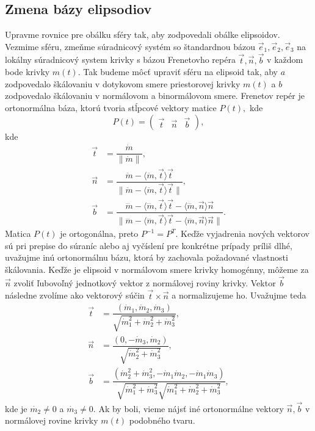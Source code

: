 \subsection{Zmena bázy elipsodiov}
Upravme rovnice pre obálku sféry tak, aby zodpovedali obálke elipsoidov. Vezmime sféru, zmeňme súradnicový systém so štandardnou bázou  $\vec{e}_1, \vec{e}_2, \vec{e}_3$ na lokálny súradnicový system krivky s bázou Frenetovho repéra $\vec{t}, \vec{n}, \vec{b}$ v každom bode krivky $m(t).$ Tak budeme môcť upraviť sféru na elipsoid tak, aby $a$ zodpovedalo škálovaniu v dotykovom smere priestorovej krivky $m(t)$ a $b$ zodpovedalo škálovaniu v normálovom a binormálovom smere. Frenetov repér je ortonormálna báza, ktorú tvoria stĺpcové vektory matice $P(t),$ kde
$$
P(t) = \left( \begin{matrix} \vec{t} & \vec{n} & \vec{b} \end{matrix} \right),
$$
kde
\begin{align*}
\vec{t} &= \dfrac{\dot{m}}{\| \dot{m} \|}, \\
\vec{n} &= \dfrac{\ddot{m} - \langle \ddot{m}, \vec{t} \rangle \vec{t}}{\| \ddot{m} - \langle \ddot{m}, \vec{t} \rangle \vec{t}\| }, \\
\vec{b} &= \dfrac{\dddot{m} - \langle \dddot{m}, \vec{t} \rangle \vec{t} - \langle \dddot{m}, \vec{n} \rangle \vec{n}}{\| \dddot{m} - \langle \dddot{m}, \vec{t} \rangle \vec{t} - \langle \dddot{m}, \vec{n} \rangle \vec{n} \| }.
\end{align*}
Matica $P(t)$ je ortogonálna, preto $P^{-1} = P^T.$
Keďže vyjadrenia nových vektorov sú pri prepise do súraníc alebo aj vyčíslení pre konkrétne prípady príliš dlhé, uvažujme inú ortonormálnu bázu, ktorá by zachovala požadované vlastnosti škálovania. Keďže je elipsoid v normálovom smere krivky homogénny, môžeme za $\vec{n}$ zvoliť ľubovoľný jednotkový vektor z normálovej roviny krivky. Vektor $\vec{b}$ následne zvolíme ako vektorový súčin $\vec{t} \times \vec{n}$ a normalizujeme ho. Uvažujme teda
\begin{align*}
\vec{t} &= \dfrac{(\dot{m}_1, \dot{m}_2, \dot{m}_3)}{\sqrt{\dot{m}_1^2 + \dot{m}_2^2 + \dot{m}_3^2}}, \\
\vec{n} &= \dfrac{(0, -\dot{m}_3, \dot{m}_2)}{\sqrt{\dot{m}_2^2 + \dot{m}_3^2}}, \\
\vec{b} &= \dfrac{(\dot{m}_2^2 + \dot{m}_3^2, -\dot{m}_1 \dot{m}_2, -\dot{m}_1 \dot{m}_3)}{\sqrt{\dot{m}_1^2 + \dot{m}_3^2}\sqrt{\dot{m}_1^2 + \dot{m}_2^2 + \dot{m}_3^2}},
\end{align*}
kde je $\dot{m_2} \neq 0$ a $\dot{m_3} \neq 0$. Ak by boli, vieme nájsť iné ortonormálne vektory $\vec{n}, \vec{b}$ v normálovej rovine krivky $m(t)$ podobného tvaru. 


